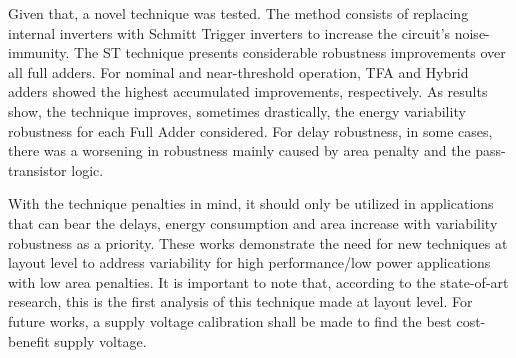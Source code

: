 \documentclass[ecp,tc, english]{iiufrgs}
\begin{document}
Given that, a novel technique was tested. The method consists of replacing internal inverters with Schmitt Trigger inverters to increase the circuit’s noise-immunity. The ST technique presents considerable robustness improvements over all full adders. For nominal and near-threshold operation, TFA and Hybrid adders showed the highest accumulated improvements, respectively. As results show, the technique improves, sometimes drastically, the energy variability robustness for each Full Adder considered. For delay robustness, in some cases, there was a worsening in robustness mainly caused by area penalty and the pass-transistor logic. 

With the technique penalties in mind, it should only be utilized in applications that can bear the delays, energy consumption and area increase with variability robustness as a priority. These works demonstrate the need for new techniques at layout level to address variability for high performance/low power applications with low area penalties. It is important to note that, according to the state-of-art research, this is the first analysis of this technique made at layout level. For future works, a supply voltage calibration shall be made to find the best cost-benefit supply voltage.




\end{document}
